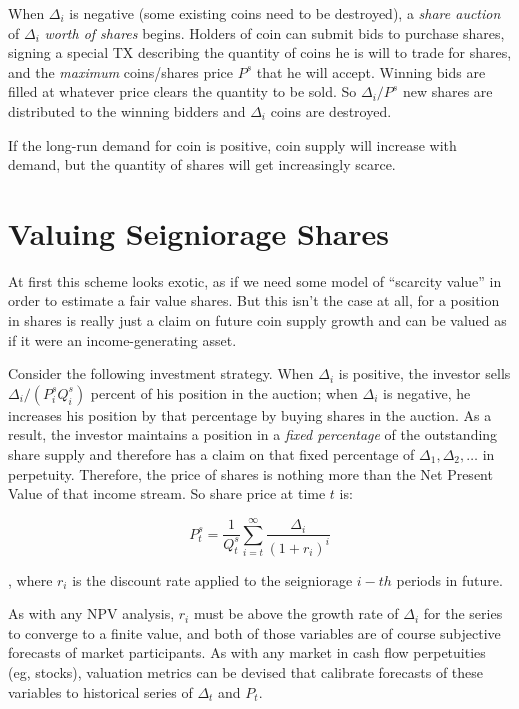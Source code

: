 \documentclass[twocolumn]{article}
\begin{document}
When $\Delta_{i}$ is negative (some existing coins need to be
destroyed), a \emph{share auction} of $\Delta_{i}$ \emph{worth of
  shares} begins. Holders of coin can submit bids to purchase shares,
signing a special TX describing the quantity of coins he is will to
trade for shares, and the \emph{maximum} coins/shares price $P^{s}$
that he will accept. Winning bids are filled at whatever price clears
the quantity to be sold. So $\Delta_{i}/P^{s}$ new shares are
distributed to the winning bidders and $\Delta_{i}$ coins are
destroyed.

If the long-run demand for coin is positive, coin supply will increase
with demand, but the quantity of shares will get increasingly
scarce.

\section*{Valuing Seigniorage Shares}
At first this scheme looks exotic, as if we need some model of
``scarcity value'' in order to estimate a fair value shares. But this
isn't the case at all, for a position in shares is really just a claim
on future coin supply growth and can be valued as if it were an
income-generating asset.

Consider the following investment strategy. When $\Delta_{i}$ is
positive, the investor sells $\Delta_{i}/(P^{s}_{i}Q^{s}_{i})$ percent
of his position in the auction; when $\Delta_{i}$ is negative, he
increases his position by that percentage by buying shares in the
auction. As a result, the investor maintains a position in a
\emph{fixed percentage} of the outstanding share supply and therefore
has a claim on that fixed percentage of $\Delta_{1}, \Delta_{2},\dots$
in perpetuity. Therefore, the price of shares is nothing more than the
Net Present Value of that income stream. So share price at time $t$
is:

\begin{equation}
\label{eqn:npv}
P^{s}_{t} = \frac{1}{Q^{s}_{t}}\sum\limits_{i=t}^{\infty}\frac{\Delta_{i}}{(1+r_{i})^{i}}
\end{equation}

, where $r_{i}$ is the discount rate applied to the seigniorage $i-th$
periods in future. 

As with any NPV analysis, $r_{i}$ must be above the growth rate of
$\Delta_{i}$ for the series to converge to a finite value, and both of
those variables are of course subjective forecasts of market
participants. As with any market in cash flow perpetuities (eg,
stocks), valuation metrics can be devised that calibrate forecasts of
these variables to historical series of $\Delta_{t}$ and $P_{t}$. 
\end{document}
